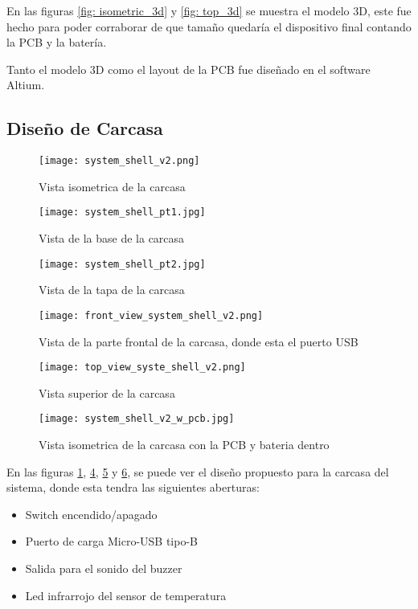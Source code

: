 En las figuras \ref{fig: isometric_3d} y \ref{fig: top_3d} se muestra el modelo 3D, este fue hecho
para poder corraborar de que tamaño quedaría el dispositivo final contando la PCB y la batería.

Tanto el modelo 3D como el layout de la PCB fue diseñado en el software Altium.
\subsection{Diseño de Carcasa}
\begin{figure}[htp!]
    \centering
    \texttt{[image: system\_shell\_v2.png]}
    \caption{Vista isometrica de la carcasa}
    \label{fig: isometric_view_shell}
\end{figure}
\FloatBarrier

\begin{figure}[htp!]
    \centering
    \texttt{[image: system\_shell\_pt1.jpg]}
    \caption{Vista de la base de la carcasa}
    \label{fig: pt1_view_shell}
\end{figure}
\FloatBarrier

\begin{figure}[htp!]
    \centering
    \texttt{[image: system\_shell\_pt2.jpg]}
    \caption{Vista de la tapa de la carcasa}
    \label{fig: pt2_view_shell}
\end{figure}
\FloatBarrier

\begin{figure}[htp!]
    \centering
    \texttt{[image: front\_view\_system\_shell\_v2.png]}
    \caption{Vista de la parte frontal de la carcasa, donde esta el puerto USB}
    \label{fig: front_view_shell}
\end{figure}
\FloatBarrier

\begin{figure}[htp!]
    \centering
    \texttt{[image: top\_view\_syste\_shell\_v2.png]}
    \caption{Vista superior de la carcasa}
    \label{fig: top_view_shell}
\end{figure}
\FloatBarrier

\begin{figure}[htp!]
    \centering
    \texttt{[image: system\_shell\_v2\_w\_pcb.jpg]}
    \caption{Vista isometrica de la carcasa con la PCB y bateria dentro}
    \label{isometric_view_pcb_shell}
\end{figure}
\FloatBarrier

En las figuras \ref{fig: isometric_view_shell}, \ref{fig: front_view_shell},
\ref{fig: top_view_shell} y \ref{isometric_view_pcb_shell}, se puede ver el diseño propuesto
para la carcasa del sistema, donde esta tendra las siguientes aberturas:

\begin{itemize}
    \item Switch encendido/apagado
    \item Puerto de carga Micro-USB tipo-B
    \item Salida para el sonido del buzzer
    \item Led infrarrojo del sensor de temperatura
\end{itemize}

